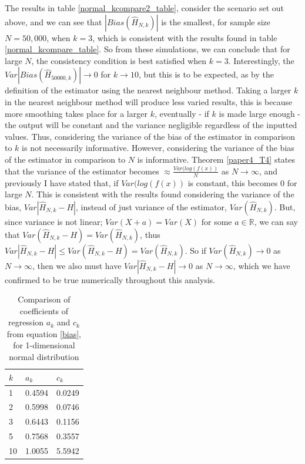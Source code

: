 \documentclass{article}
\begin{document}
The results in table \ref{normal_kcompare2_table}, consider the scenario set out above, and we can see that $|Bias(\hat{H}_{N, k})|$ is the smallest, for sample size $N=50,000$, when $k=3$, which is consistent with the results found in table \ref{normal_kcompare_table}. So from these simulations, we can conclude that for large $N$, the consistency condition is best satisfied when $k=3$. 
Interestingly, the $Var|Bias(\hat{H}_{50000, k})| \to 0$ for $k \to 10$, but this is to be expected, as by the definition of the estimator using the nearest neighbour method. Taking a larger $k$ in the nearest neighbour method will produce less varied results, this is because more smoothing takes place for a larger $k$, eventually - if $k$ is made large enough - the output will be constant and the variance negligible regardless of the inputted values. Thus, considering the variance of the bias of the estimator in comparison to $k$ is not necessarily informative. 
However, considering the variance of the bias of the estimator in comparison to $N$ is informative. Theorem \ref{paper4_T4} states that the variance of the estimator becomes $\approx \frac{Var(log(f(x))}{N}$ as $N \to \infty$, and previously I have stated that, if $Var(log(f(x))$ is constant, this becomes 0 for large $N$. This is consistent with the results found considering the variance of the bias, $Var|\hat{H}_{N, k} - H|$, instead of just variance of the estimator, $Var(\hat{H}_{N, k})$. But, since variance is not linear; $Var(X+a)=Var(X)$ for some $a \in \mathbb{R}$, we can say that $Var(\hat{H}_{N, k} - H) = Var(\hat{H}_{N, k})$, thus  $Var|\hat{H}_{N, k} - H| \leq Var(\hat{H}_{N, k} - H) = Var(\hat{H}_{N, k})$. So if $Var(\hat{H}_{N, k}) \to 0$ as $N \to \infty$, then we also must have $Var|\hat{H}_{N, k} - H| \to 0$ as $N \to \infty$, which we have confirmed to be true numerically throughout this analysis.

\begin{table}
\caption{Comparison of coefficients of regression $a_{k}$ and $c_{k}$ from equation \ref{bias}, for 1-dimensional normal distribution} \label{normal_a_c_compare_table}
\begin{center}
\begin{tabular}{| l | l l |} 
\toprule
$k$ &  $a_{k}$ & $c_{k}$ \\
\midrule[1pt]
1      & 0.4594     & 0.0249  \\
2      & 0.5998     & 0.0746  \\
3      & 0.6443     & 0.1156  \\
5      & 0.7568     & 0.3557  \\
10    & 1.0055     & 5.5942  \\
\hline
\end{tabular}
\\[10pt]
\end{center}
\end{table}
\end{document}
